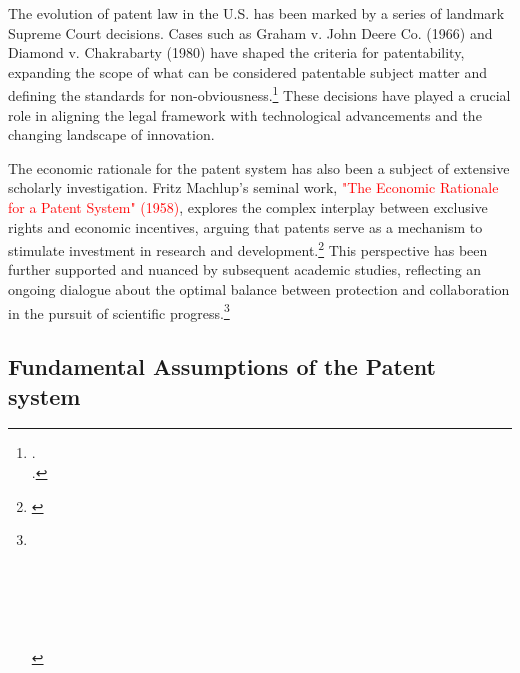 \documentclass{article}[10pt]
\begin{document}
The evolution of patent law in the U.S. has been marked by a series of landmark Supreme Court decisions. Cases such as Graham v. John Deere Co. (1966) and Diamond v. Chakrabarty (1980) have shaped the criteria for patentability, expanding the scope of what can be considered patentable subject matter and defining the standards for non-obviousness.\footnote{
    \cite{1966graham}.\\
    \indent\indent \cite{1980diamond}.}
These decisions have played a crucial role in aligning the legal framework with technological advancements and the changing landscape of innovation.\par

The economic rationale for the patent system has also been a subject of extensive scholarly investigation. Fritz Machlup's seminal work, \textcolor{red}{"The Economic Rationale for a Patent System" (1958)}, explores the complex interplay between exclusive rights and economic incentives, arguing that patents serve as a mechanism to stimulate investment in research and development.\footnote{
    \cite{machlup1958economic}} 
This perspective has been further supported and nuanced by subsequent academic studies, reflecting an ongoing dialogue about the optimal balance between protection and collaboration in the pursuit of scientific progress.\footnote{
    \cite{merges1990complex}\\
    \indent\indent \cite{scotchmer1991standing}\\
    \indent\indent \cite{gallini2002economics}\\
    \indent\indent \cite{heller1998can}\\
    \indent\indent \cite{hall2001patent}\\
    \indent\indent \cite{lemley2007universities}\\
    \indent\indent \cite{bessen2009patent}}

\subsection{Fundamental Assumptions of the Patent system}
\end{document}
